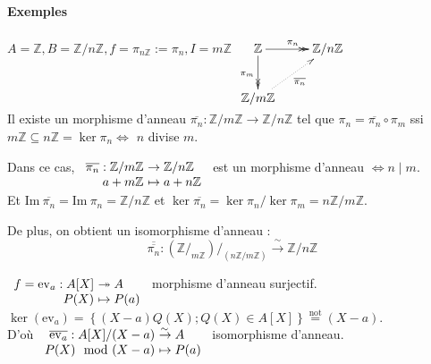 \documentclass[reqno,a4paper,10pt]{report}
\makeatletter
\newcommand{\set}[1]{\left\lbrace #1 \right\rbrace} %
\newcommand{\im}{\mathrm{Im}\:} %
\newcommand{\IZ}{\ensuremath{\mathbb{Z}}\xspace} %
\newcommand{\IC}{\ensuremath{\mathbb{C}}\xspace} %
\newcommand{\surj}{\twoheadrightarrow}
\newcommand{\bij}{\overset{\!\sim}{\to}} %
\newcommand{\ev}[1]{\mathrm{ev}_{ #1 }}
\let\oldenumerate=\enumerate%
\renewenvironment{enumerate}{%
    \oldenumerate%
  }{%
    \@noparlisttrue%
    \endlist%
  }%
\makeatother
\begin{document}
\paragraph{Exemples}
\begin{enumerate}
  \item $A=\IZ, B=\IZ/n\IZ, f = \pi_{n\IZ}:=\pi_n, I = m\IZ$
    \hspace{4.2em}$\xymatrix{
    \IZ \ar@{->>}[r]^{\pi_n} \ar@{->>}[d]_{\pi_m} & \IZ/n\IZ\\
    \IZ/m\IZ \ar@{.>}[ur]_{\overline{\pi_n}}
    }$\\Il existe un morphisme d'anneau $\overline{\pi_n}: \IZ/m\IZ \to
    \IZ/n\IZ$ tel que $\pi_n=\overline{\pi_n} \circ \pi_m$ ssi $m\IZ \subseteq
    n\IZ = \ker \pi_n \iff $ $n$ divise $m$.

    Dans ce cas, $\begin{array}[t]{r@{\ }l}
      \overline{\pi_n} : \IZ/m\IZ &\to \IZ/n\IZ\\
      a+m\IZ &\mapsto a+n\IZ
    \end{array}$ est un morphisme d'anneau $\iff n \mid m$.\\
    Et $\im \overline{\pi_n}= \im \pi_n=\IZ/n\IZ$ et $\ker
    \overline{\pi_n}=\ker \pi_n/\ker \pi_m=n\IZ/m\IZ$.
    
    De plus, on obtient un isomorphisme d'anneau :
    \[\overline{\overline{\pi_n}} : \left( \IZ/_{m\IZ} \right)/_{\left(
    n\IZ/m\IZ
    \right)} \bij \IZ/n\IZ\]
  \begin{comment}
  \item Exemple avec $A\times B / \set{(a,0_B)}$ 15/10/09 p2
  \end{comment}
  \item $
    \begin{array}[t]{r@{\ }l}
      f=\ev a : A[X] &\surj A\\
      P(X) &\mapsto P(a)
    \end{array}
    $ morphisme d'anneau surjectif. \\$\ker(\ev a) = \set{(X-a)Q(X); Q(X) \in
    A[X]} \overset{\text{not}}{=} (X-a)$.\\
    D'où $
    \begin{array}[t]{r@{\ }l}
      \overline{\ev a} : A[X] / (X-a) &\bij A \\
      P(X) \mod (X-a) &\mapsto P(a)
    \end{array}
       $ isomorphisme d'anneau.
  \begin{comment}
  \item Injection, $f^{-1}$ et création de sous anneau de $\IC$ 15/10/09 p2
    verso.
  \end{comment}
\end{enumerate}
\end{document}
